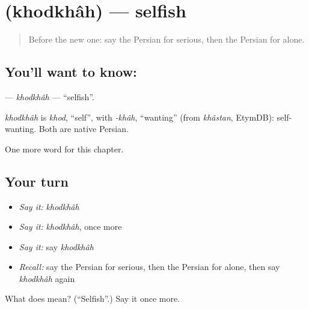 \section[\texorpdfstring{\fa{خودخواه} (khodkhâh)}{خودخواه (khodkhâh)}]{ (khodkhâh) — selfish}

\label{lesson:FA-C200-khodkhah}



\begin{quote}
Before the new one: say the Persian for serious, then the Persian for alone.
\end{quote}

\subsection*{You'll want to know: }
\textbf{} — \emph{khodkhâh} — \textquotedblleft{}selfish\textquotedblright{}.

\begin{cousinweb}
\emph{khodkhâh} is \emph{khod}, \textquotedblleft{}self\textquotedblright{}, with \emph{-khâh}, \textquotedblleft{}wanting\textquotedblright{} (from \emph{khâstan}, EtymDB): self-wanting. Both are native Persian.
\end{cousinweb}

\begin{grammarlens}[title={What you've built}]
One more word for this chapter.
\end{grammarlens}

\subsection*{Your turn}
\begin{itemize}
\raggedright
  \item \emph{Say it:} \emph{khodkhâh}
  \item \emph{Say it:} \emph{khodkhâh}, once more
  \item \emph{Say it:} say \emph{khodkhâh}
  \item \emph{Recall:} say the Persian for serious, then the Persian for alone, then say \emph{khodkhâh} again
\end{itemize}

\begin{tcolorbox}[breakable,colback=teal!4,colframe=teal!35!black,title={Before you move on}]
What does  mean? (\textquotedblleft{}Selfish\textquotedblright{}.) Say it once more.
\end{tcolorbox}
